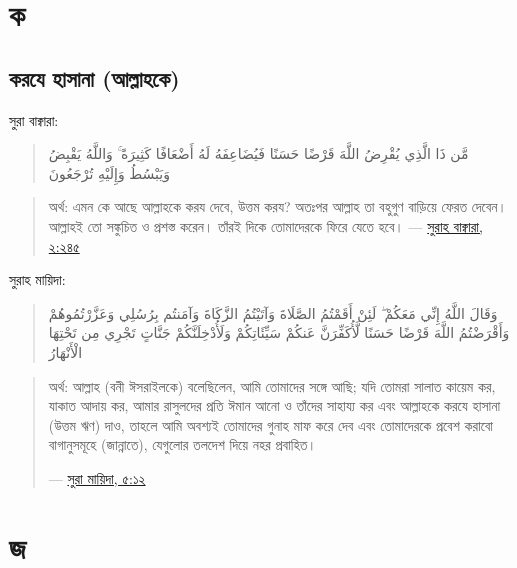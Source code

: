 \documentclass[
]{book}
\begin{document}
\hypertarget{k}{%
\section*{ক}\label{k}}

\hypertarget{ux995ux9b0ux9afux9c7-ux9b9ux9beux9b8ux9beux9a8ux9be-ux986ux9b2ux9cdux9b2ux9beux9b9ux995ux9c7}{%
\subsection*{করযে হাসানা (আল্লাহকে)}\label{ux995ux9b0ux9afux9c7-ux9b9ux9beux9b8ux9beux9a8ux9be-ux986ux9b2ux9cdux9b2ux9beux9b9ux995ux9c7}}

সুরা বাক্বারা:

\begin{quote}
مَّن ذَا الَّذِي يُقْرِضُ اللَّهَ قَرْضًا حَسَنًا فَيُضَاعِفَهُ لَهُ أَضْعَافًا كَثِيرَةً ۚ وَاللَّهُ يَقْبِضُ وَيَبْسُطُ وَإِلَيْهِ تُرْجَعُونَ
\end{quote}

\begin{quote}
অর্থ: এমন কে আছে আল্লাহকে করয দেবে, উত্তম করয? অতঃপর আল্লাহ তা বহুগুণ বাড়িয়ে ফেরত দেবেন। আল্লাহই তো সঙ্কুচিত ও প্রশস্ত করেন। তাঁরই দিকে তোমাদেরকে ফিরে যেতে হবে।
--- \href{https://tanzil.net/\#2:245}{সুরাহ বাক্বারা, ২:২৪৫}
\end{quote}

সুরাহ মায়িদা:

\begin{quote}
وَقَالَ اللَّهُ إِنِّي مَعَكُمْ ۖ لَئِنْ أَقَمْتُمُ الصَّلَاةَ وَآتَيْتُمُ الزَّكَاةَ وَآمَنتُم بِرُسُلِي وَعَزَّرْتُمُوهُمْ وَأَقْرَضْتُمُ اللَّهَ قَرْضًا حَسَنًا لَّأُكَفِّرَنَّ عَنكُمْ سَيِّئَاتِكُمْ وَلَأُدْخِلَنَّكُمْ جَنَّاتٍ تَجْرِي مِن تَحْتِهَا الْأَنْهَارُ
\end{quote}

\begin{quote}
অর্থ: আল্লাহ (বনী ঈসরাইলকে) বলেছিলেন, আমি তোমাদের সঙ্গে আছি; যদি তোমরা সালাত কায়েম কর, যাকাত আদায় কর, আমার রাসুলদের প্রতি ঈমান আনো ও তাঁদের সাহায্য কর এবং আল্লাহকে করযে হাসানা (উত্তম ঋণ) দাও, তাহলে আমি অবশ্যই তোমাদের গুনাহ মাফ করে দেব এবং তোমাদেরকে প্রবেশ করাবো বাগানুসমূহে (জান্নাতে), যেগুলোর তলদেশ দিয়ে নহর প্রবাহিত।

--- \href{https://tanzil.net/\#5:12}{সুরা মায়িদা, ৫:১২}
\end{quote}

\hypertarget{j}{%
\section*{জ}\label{j}}
\end{document}
